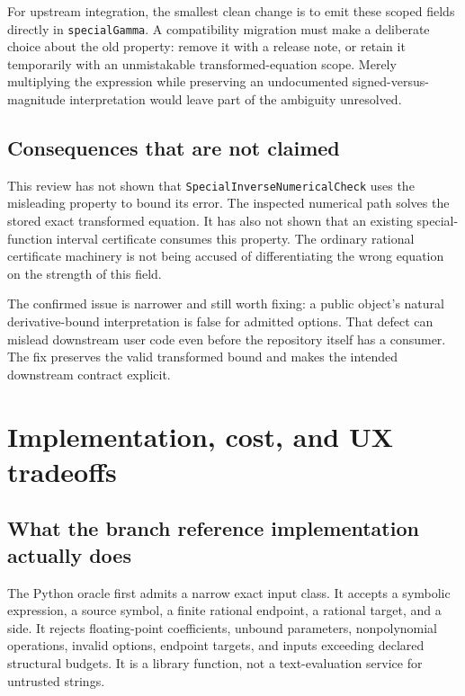 \documentclass[11pt,letterpaper]{article}
\newcommand{\code}[1]{{\small\nolinkurl{#1}}}
\begin{document}
For upstream integration, the smallest clean change is to emit these scoped fields directly in \code{specialGamma}. A compatibility migration must make a deliberate choice about the old property: remove it with a release note, or retain it temporarily with an unmistakable transformed-equation scope. Merely multiplying the expression while preserving an undocumented signed-versus-magnitude interpretation would leave part of the ambiguity unresolved.

\subsection{Consequences that are not claimed}

This review has not shown that \code{SpecialInverseNumericalCheck} uses the misleading property to bound its error. The inspected numerical path solves the stored exact transformed equation. It has also not shown that an existing special-function interval certificate consumes this property. The ordinary rational certificate machinery is not being accused of differentiating the wrong equation on the strength of this field.\cite{special,cert}

The confirmed issue is narrower and still worth fixing: a public object's natural derivative-bound interpretation is false for admitted options. That defect can mislead downstream user code even before the repository itself has a consumer. The fix preserves the valid transformed bound and makes the intended downstream contract explicit.

\section{Implementation, cost, and UX tradeoffs}
\label{sec:engineering}

\subsection{What the branch reference implementation actually does}

The Python oracle first admits a narrow exact input class. It accepts a symbolic expression, a source symbol, a finite rational endpoint, a rational target, and a side. It rejects floating-point coefficients, unbound parameters, nonpolynomial operations, invalid options, endpoint targets, and inputs exceeding declared structural budgets. It is a library function, not a text-evaluation service for untrusted strings.
\end{document}
